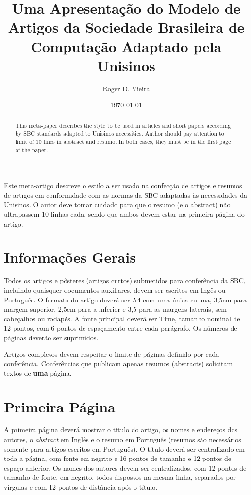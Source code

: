 \documentclass[12pt]{article}
\date{\today}
\title{
    Uma Apresentação do Modelo de Artigos da Sociedade Brasileira de Computação Adaptado pela Unisinos
}
\author{Roger D. Vieira\inst{1}}
\begin{document}
 

\imprimircapa
\imprimirfolhaderosto

\maketitle

\begin{abstract}

This meta-paper describes the style to be used in articles and short papers according by SBC standards adapted to Unisinos necessities. Author should pay attention to limit of 10 lines in abstract and resumo. In both cases, they must be in the first page of the paper.
\end{abstract}
     
\begin{resumo} 
  Este meta-artigo descreve o estilo a ser usado na confecção de artigos e resumos de artigos em conformidade com as normas da SBC adaptadas às necessidades da Unisinos. O autor deve tomar cuidado para que o resumo (e o abstract) não ultrapassem 10 linhas cada, sendo que ambos devem estar na primeira
  página do artigo.
\end{resumo}


\section{Informações Gerais}


Todos os artigos e pôsteres (artigos curtos) submetidos para conferência da SBC, incluindo quaisquer documentos auxiliares, devem ser escritos em Ingês ou Português. O formato do artigo deverá ser A4 com uma única coluna, 3,5cm para margem superior,  2,5cm para a inferior e 3,5 para as margens laterais, sem cabeçalhos ou rodapés. A fonte principal deverá ser Time, tamanho nominal de 12 pontos, com 6 pontos de espaçamento entre cada parágrafo. Os números de páginas deverão ser suprimidos.

Artigos completos devem respeitar o limite de páginas definido por cada conferência. Conferências que publicam apenas resumos (abstracts) solicitam textos de \textbf{uma} página.

\section{Primeira Página} \label{sec:firstpage}

A primeira página deverá mostrar o título do artigo, os nomes e endereços dos autores, o \emph{abstract} em Inglês e o resumo em Português (resumos são necessários somente para artigos escritos em Português). O título deverá ser centralizado em toda a página, com fonte em negrito e 16 pontos de tamanho e 12 pontos de espaço anterior. Os nomes dos autores devem ser centralizados, com 12 pontos de tamanho de fonte, em negrito, todos dispostos na mesma linha, separados por vírgulas e com 12 pontos de distância após o título. 
\end{document}
